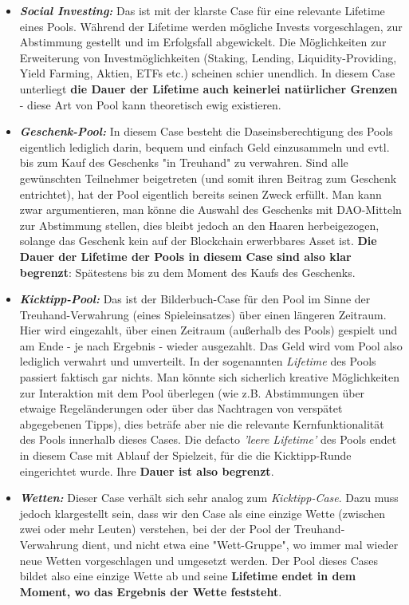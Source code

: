 \begin{itemize}
  \item \textbf{\textit{Social Investing:}} Das ist mit der klarste Case für eine relevante Lifetime eines Pools. Während der Lifetime werden mögliche Invests vorgeschlagen, zur Abstimmung gestellt und im Erfolgsfall abgewickelt. Die Möglichkeiten zur Erweiterung von Investmöglichkeiten (Staking, Lending, Liquidity-Providing, Yield Farming, Aktien, ETFs etc.) scheinen schier unendlich. In diesem Case unterliegt \textbf{die Dauer der Lifetime auch keinerlei natürlicher Grenzen} - diese Art von Pool kann theoretisch ewig existieren.
  \item \textbf{\textit{Geschenk-Pool:}} In diesem Case besteht die Daseinsberechtigung des Pools eigentlich lediglich darin, bequem und einfach Geld einzusammeln und evtl. bis zum Kauf des Geschenks "in Treuhand" zu verwahren. Sind alle gewünschten Teilnehmer beigetreten (und somit ihren Beitrag zum Geschenk entrichtet), hat der Pool eigentlich bereits seinen Zweck erfüllt. Man kann zwar argumentieren, man könne die Auswahl des Geschenks mit DAO-Mitteln zur Abstimmung stellen, dies bleibt jedoch an den Haaren herbeigezogen, solange das Geschenk kein auf der Blockchain erwerbbares Asset ist. \textbf{Die Dauer der Lifetime der Pools in diesem Case sind also klar begrenzt}: Spätestens bis zu dem Moment des Kaufs des Geschenks.
  \item \textbf{\textit{Kicktipp-Pool:}} Das ist der Bilderbuch-Case für den Pool im Sinne der Treuhand-Verwahrung (eines Spieleinsatzes) über einen längeren Zeitraum. Hier wird eingezahlt, über einen Zeitraum (außerhalb des Pools) gespielt und am Ende - je nach Ergebnis - wieder ausgezahlt. Das Geld wird vom Pool also lediglich verwahrt und umverteilt. In der sogenannten \textit{Lifetime} des Pools passiert faktisch gar nichts. Man könnte sich sicherlich kreative Möglichkeiten zur Interaktion mit dem Pool überlegen (wie z.B. Abstimmungen über etwaige Regeländerungen oder über das Nachtragen von verspätet abgegebenen Tipps), dies beträfe aber nie die relevante Kernfunktionalität des Pools innerhalb dieses Cases. Die defacto \textit{'leere Lifetime'} des Pools endet in diesem Case mit Ablauf der Spielzeit, für die die Kicktipp-Runde eingerichtet wurde. Ihre \textbf{Dauer ist also begrenzt}.
  \item \textbf{\textit{Wetten:}} Dieser Case verhält sich sehr analog zum \textit{Kicktipp-Case}. Dazu muss jedoch klargestellt sein, dass wir den Case als eine einzige Wette (zwischen zwei oder mehr Leuten) verstehen, bei der der Pool der Treuhand-Verwahrung dient, und nicht etwa eine "Wett-Gruppe", wo immer mal wieder neue Wetten vorgeschlagen und umgesetzt werden. Der Pool dieses Cases bildet also eine einzige Wette ab und seine \textbf{Lifetime endet in dem Moment, wo das Ergebnis der Wette feststeht}.

\end{itemize}
